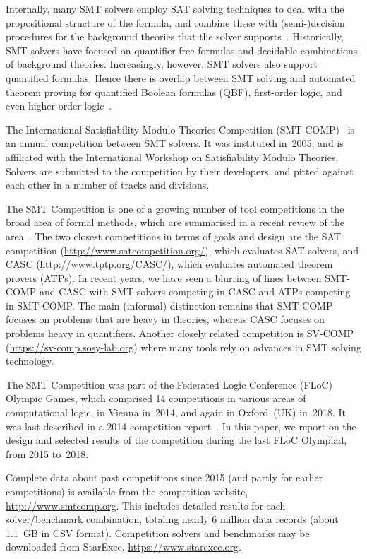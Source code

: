 \documentclass[dvipsnames,table,twoside,11pt]{article}
\begin{document}
Internally, many SMT solvers employ SAT solving techniques to deal
with the propositional structure of the formula, and combine these
with (semi-)decision procedures for the background theories that the
solver
supports~\cite{DBLP:conf/cav/BarrettCDHJKRT11,DBLP:conf/cade/BoutonODF09,DBLP:conf/tacas/MouraB08,Nieuwenhuis:2006:SSS:1217856.1217859}.
Historically, SMT solvers have focused on quantifier-free formulas and
decidable combinations of background theories.  Increasingly, however,
SMT solvers also support quantified formulas.  Hence there is overlap
between SMT solving and automated theorem proving for quantified
Boolean formulas (QBF), first-order logic, and even higher-order
logic~\cite{DBLP:journals/corr/abs-1712-01486}.

The International Satisfiability Modulo Theories Competition
(SMT-COMP)~\cite{BdMS05,BdMS07,BDdMOS13,BDOS08,BDOS10,CDW14,CGBD12} is
an annual competition between SMT solvers.  It was instituted in~2005,
and is affiliated with the International Workshop on Satisfiability
Modulo Theories.  Solvers are submitted to the competition by their
developers, and pitted against each other in a number of tracks and
divisions.

The SMT Competition is one of a growing number of tool competitions in the broad area of formal methods, which are summarised in a recent review of the area~\cite{toolympics}. The two closest competitions in terms of goals and design are the SAT competition (\url{http://www.satcompetition.org/}), which evaluates SAT solvers, and CASC (\url{http://www.tptp.org/CASC/}), which evaluates automated theorem provers (ATPs). In recent years, we have seen a blurring of lines between SMT-COMP and CASC with SMT solvers competing in CASC and ATPs competing in SMT-COMP. The main (informal) distinction remains that SMT-COMP focuses on problems that are heavy in theories, whereas CASC focuses on problems heavy in quantifiers.
Another closely related competition is SV-COMP (\url{https://sv-comp.sosy-lab.org}) where many tools rely on advances in SMT solving technology.

The SMT Competition was part of the Federated Logic
Conference (FLoC) Olympic Games, which comprised 14 competitions in
various areas of computational logic, in Vienna in~2014, and again in
Oxford~(UK) in~2018.  It was last described in a 2014 competition
report~\cite{CDW14}.  In this paper, we report on the design and
selected results of the competition during the last FLoC Olympiad,
from 2015 to~2018.

Complete data about past competitions since 2015 (and partly for
earlier competitions) is available from the competition website,
\url{http://www.smtcomp.org}.  This includes detailed results for each
solver/benchmark combination, totaling nearly 6 million data records
(about \SI{1.1}{GB} in CSV format).  Competition solvers and
benchmarks may be downloaded from StarExec,
\url{https://www.starexec.org}.
\end{document}
